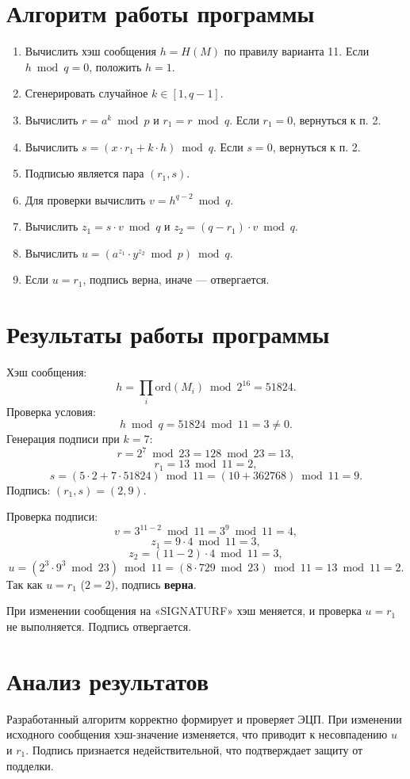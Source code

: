 \documentclass[12pt]{article}
\begin{document}
\section{Алгоритм работы программы}
\begin{enumerate}
    \item Вычислить хэш сообщения \(h = H(M)\) по правилу варианта 11. Если \(h \bmod q = 0\), положить \(h = 1\).
    \item Сгенерировать случайное \(k \in [1, q-1]\).
    \item Вычислить \(r = a^k \bmod p\) и \(r_1 = r \bmod q\). Если \(r_1 = 0\), вернуться к п. 2.
    \item Вычислить \(s = (x \cdot r_1 + k \cdot h) \bmod q\). Если \(s = 0\), вернуться к п. 2.
    \item Подписью является пара \((r_1, s)\).
    \item Для проверки вычислить \(v = h^{q-2} \bmod q\).
    \item Вычислить \(z_1 = s \cdot v \bmod q\) и \(z_2 = (q - r_1) \cdot v \bmod q\).
    \item Вычислить \(u = (a^{z_1} \cdot y^{z_2} \bmod p) \bmod q\).
    \item Если \(u = r_1\), подпись верна, иначе — отвергается.
\end{enumerate}

\section{Результаты работы программы}
Хэш сообщения:
\[
h = \prod_{i} \text{ord}(M_i) \bmod 2^{16} = 51824.
\]
Проверка условия:
\[
h \bmod q = 51824 \bmod 11 = 3 \neq 0.
\]
Генерация подписи при \(k=7\):
\[
r = 2^7 \bmod 23 = 128 \bmod 23 = 13,
\]
\[
r_1 = 13 \bmod 11 = 2,
\]
\[
s = (5 \cdot 2 + 7 \cdot 51824) \bmod 11 = (10 + 362768) \bmod 11 = 9.
\]
Подпись: \((r_1, s) = (2, 9)\).

Проверка подписи:
\[
v = 3^{11-2} \bmod 11 = 3^9 \bmod 11 = 4,
\]
\[
z_1 = 9 \cdot 4 \bmod 11 = 3,
\]
\[
z_2 = (11 - 2) \cdot 4 \bmod 11 = 3,
\]
\[
u = (2^3 \cdot 9^3 \bmod 23) \bmod 11 = (8 \cdot 729 \bmod 23) \bmod 11 = 13 \bmod 11 = 2.
\]
Так как \(u = r_1\) (\(2 = 2\)), подпись \textbf{верна}.

При изменении сообщения на «SIGNATURF» хэш меняется, и проверка \(u = r_1\) не выполняется. Подпись отвергается.

\section{Анализ результатов}
Разработанный алгоритм корректно формирует и проверяет ЭЦП. При изменении исходного сообщения хэш-значение изменяется, что приводит к несовпадению \(u\) и \(r_1\). Подпись признается недействительной, что подтверждает защиту от подделки.
\end{document}
